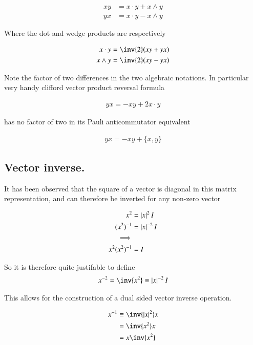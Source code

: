 \documentclass{article}
\newcommand{\symmetric}[2]{{\{{#1},{#2}\}}}
\begin{document}
\begin{align}
x y &= {x} \cdot {y} + {x} \wedge {y} \\
y x &= {x} \cdot {y} - {x} \wedge {y}
\end{align}

Where the dot and wedge products are respectively

\begin{align*}
x \cdot y &= \inv{2}(x y + y x) \\
x \wedge y &= \inv{2}(x y - y x)
\end{align*}

Note the factor of two differences in the two algebraic notations.  In particular very handy clifford vector product reversal formula

\begin{align*}
y x = - x y + 2 x \cdot y
\end{align*}

has no factor of two in its Pauli anticommutator equivalent

\begin{align}
y x = - x y + \symmetric{x}{y}
\end{align}

\subsection{ Vector inverse. }

It has been observed that the square of a vector is diagonal in this matrix representation, and can therefore be inverted for any non-zero vector

\begin{align*}
x^2 &= \left\lvert{x}\right\rvert^2 I \\
(x^2)^{-1} &= \left\lvert{x}\right\rvert^{-2} I \\
\implies \\
x^2 (x^2)^{-1} &= I \\
\end{align*}

So it is therefore quite justifable to define
\begin{align*}
x^{-2} = \inv{x^2} \equiv \Abs{x}^{-2} I \\
\end{align*}

This allows for the construction of a dual sided vector inverse operation.

\begin{align*}
x^{-1}
&\equiv \inv{\Abs{x}^2} x \\
&= \inv{x^2} x \\
&= x \inv{x^2} \\
\end{align*}
\end{document}

